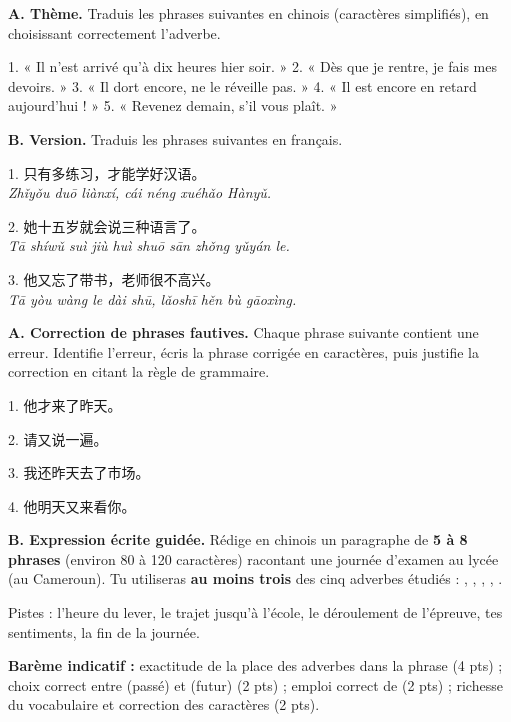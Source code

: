\documentclass[11pt]{article}
\newcommand{\zh}[1]{\ifmmode\text{#1}\else{#1}\fi}
\begin{document}
\begin{exercice}
\textbf{A. Thème.} Traduis les phrases suivantes en chinois (caractères simplifiés), en choisissant correctement l'adverbe.

1. « Il n'est arrivé qu'à dix heures hier soir. »
2. « Dès que je rentre, je fais mes devoirs. »
3. « Il dort encore, ne le réveille pas. »
4. « Il est encore en retard aujourd'hui ! »
5. « Revenez demain, s'il vous plaît. »

\textbf{B. Version.} Traduis les phrases suivantes en français.

1. 只有多练习，才能学好汉语。\\
\emph{Zhǐyǒu duō liànxí, cái néng xuéhǎo Hànyǔ.}

2. 她十五岁就会说三种语言了。\\
\emph{Tā shíwǔ suì jiù huì shuō sān zhǒng yǔyán le.}

3. 他又忘了带书，老师很不高兴。\\
\emph{Tā yòu wàng le dài shū, lǎoshī hěn bù gāoxìng.}
\end{exercice}

\begin{exercice}
\textbf{A. Correction de phrases fautives.} Chaque phrase suivante contient une erreur. Identifie l'erreur, écris la phrase corrigée en caractères, puis justifie la correction en citant la règle de grammaire.

1. 他才来了昨天。

2. 请又说一遍。

3. 我还昨天去了市场。

4. 他明天又来看你。

\textbf{B. Expression écrite guidée.} Rédige en chinois un paragraphe de \textbf{5 à 8 phrases} (environ 80 à 120 caractères) racontant une journée d'examen au lycée (au Cameroun). Tu utiliseras \textbf{au moins trois} des cinq adverbes étudiés : \zh{就}, \zh{才}, \zh{还}, \zh{又}, \zh{再}.

Pistes : l'heure du lever, le trajet jusqu'à l'école, le déroulement de l'épreuve, tes sentiments, la fin de la journée.

\textbf{Barème indicatif :} exactitude de la place des adverbes dans la phrase (4 pts) ; choix correct entre \zh{又} (passé) et \zh{再} (futur) (2 pts) ; emploi correct de \zh{了} (2 pts) ; richesse du vocabulaire et correction des caractères (2 pts).
\end{exercice}
\end{document}
